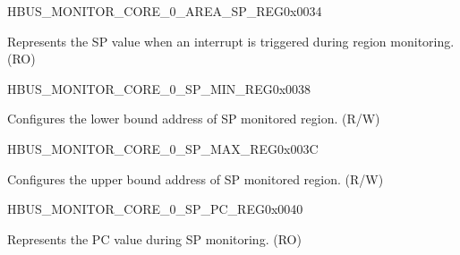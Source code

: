 \begin{register}{H}{BUS\_MONITOR\_CORE\_0\_AREA\_SP\_REG}{0x0034}\label{regdesc:BUSMONITORCORE0AREASPREG}
%
\regnewline%
\begin{regdesc}\begin{reglist}
\label{fielddesc:BUSMONITORCORE0AREASP}\item [BUS\_MONITOR\_CORE\_0\_AREA\_SP] Represents the SP value when an interrupt is triggered during region monitoring. (RO)
\end{reglist}\end{regdesc}
\end{register}


\begin{register}{H}{BUS\_MONITOR\_CORE\_0\_SP\_MIN\_REG}{0x0038}\label{regdesc:BUSMONITORCORE0SPMINREG}
%
\regnewline%
\begin{regdesc}\begin{reglist}
\label{fielddesc:BUSMONITORCORE0SPMIN}\item [BUS\_MONITOR\_CORE\_0\_SP\_MIN] Configures the lower bound address of SP monitored region. (R/W)
\end{reglist}\end{regdesc}
\end{register}


\begin{register}{H}{BUS\_MONITOR\_CORE\_0\_SP\_MAX\_REG}{0x003C}\label{regdesc:BUSMONITORCORE0SPMAXREG}
%
\regnewline%
\begin{regdesc}\begin{reglist}
\label{fielddesc:BUSMONITORCORE0SPMAX}\item [BUS\_MONITOR\_CORE\_0\_SP\_MAX] Configures the upper bound address of SP monitored region. (R/W)
\end{reglist}\end{regdesc}
\end{register}


\begin{register}{H}{BUS\_MONITOR\_CORE\_0\_SP\_PC\_REG}{0x0040}\label{regdesc:BUSMONITORCORE0SPPCREG}
%
\regnewline%
\begin{regdesc}\begin{reglist}
\label{fielddesc:BUSMONITORCORE0SPPC}\item [BUS\_MONITOR\_CORE\_0\_SP\_PC] Represents the PC value during SP monitoring. (RO)
\end{reglist}\end{regdesc}
\end{register}



